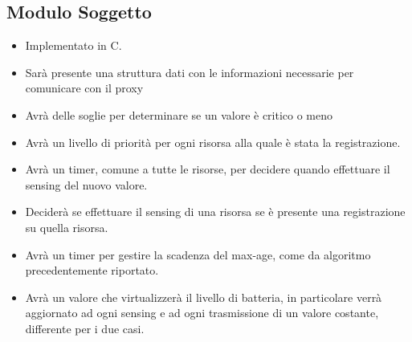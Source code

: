     \subsection{Modulo Soggetto}

      \begin{itemize}
        \item Implementato in C.
        \item Sarà presente una struttura dati con le informazioni necessarie per comunicare con il proxy
        \item Avrà delle soglie per determinare se un valore è critico o meno
        \item Avrà un livello di priorità per ogni risorsa alla quale è stata la registrazione.
        \item Avrà un timer, comune a tutte le risorse, per decidere quando effettuare il sensing del nuovo valore.
        \item Deciderà se effettuare il sensing di una risorsa se è presente una registrazione su quella risorsa.
        \item Avrà un timer per gestire la scadenza del max-age, come da algoritmo precedentemente riportato.
        \item Avrà un valore che virtualizzerà il livello di batteria, in particolare verrà aggiornato ad ogni sensing e ad ogni trasmissione di un valore costante, differente per i due casi.
      \end{itemize}
